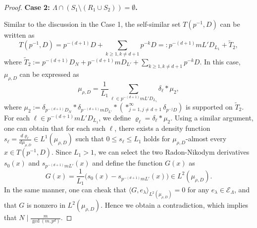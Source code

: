 \documentclass[10pt,a4paper]{amsart}
\begin{document}
\begin{proof}
\medskip

\textbf{Case 2: $\Lambda\cap (S_1 \setminus (R_1\cup S_2))=\emptyset$.}

Similar to the discussion in the Case 1, the self-similar set $T(p^{-1},D)$ can be written as
$$T(p^{-1},D)=p^{-(d+1)}D+\sum_{k \ge 1,k \neq d+1}p^{-k}D=:p^{-(d+1)}mL'D_{L_1}+\tilde{T}_2,$$
where $\tilde{T}_2:=p^{-(d+1)}D_{N}+p^{-(d+1)}mD_{L'} +\sum_{k \ge 1,k \neq d+1}p^{-k}D $.
In this case,  $\mu_{\rho,D}$ can be expressed as 
$$\mu_{\rho,D}=\frac{1}{L_1} \sum_{\ell \in p^{-(d+1)}mL'D_{L_1}}\delta_{\ell} \ast \mu_2,$$
where $\mu_2:=\delta_{p^{-(d+1)}D_{N}} \ast \delta_{p^{-(d+1)}mD_{L'}} \ast (\ast^{\infty}_{j=1,j \neq d+1} \delta_{p^{-j}D})$ is supported on $\tilde{T}_2$.
 For each $\ell \in p^{-(d+1)}mL'D_{L_1}$, we define  $\varrho_{\ell} = \delta_{\ell} \ast \mu_2$. Using a similar argument, one can obtain that for each such $\ell$, there exists a density function $s_{\ell} = \frac{d\varrho_{\ell}}{d\mu_{\rho,D}} \in L^1(\mu_{\rho,D})$ such that $0 \le s_{\ell} \le L_1$ holds for $\mu_{\rho,D}$-almost every $x \in T(p^{-1},D)$. 
Since $L_1>1$, we can select the two Radon-Nikodym derivatives $s_{0}(x)$ and $s_{p^{-(d+1)}mL'}(x)$ and define the function $G(x)$ as
\begin{equation*}
	G(x) = \frac{1}{L_1} \Big( s_{0}(x) - s_{p^{-(d+1)}mL'}(x) \Big) \in L^2(\mu_{\rho,D}).
\end{equation*}
In the same manner, one can cheak that 
$\langle G,e_{\lambda} \rangle_{L^2(\mu_{\rho,D})}=0$ for any $e_{\lambda}\in \mathcal{E}_\Lambda$,
 and that $G$ is nonzero in $L^2(\mu_{\rho,D})$. 
 Hence we obtain a contradiction, which implies that $N\mid\frac{m}{\gcd(m,p^{d})}$.
\end{proof}
\end{document}
